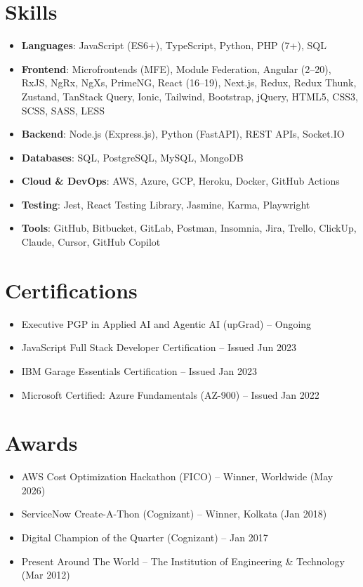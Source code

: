 \documentclass[letterpaper,11pt]{article}
\newcommand{\resumeItemPlain}[1]{
  \item\small{#1 \vspace{-2.5pt}}
}
\newcommand{\resumeSimpleListStart}{\begin{itemize}[leftmargin=0.15in, label=$\circ$, itemsep=1pt, parsep=0pt, topsep=1pt]}
\newcommand{\resumeSimpleListEnd}{\end{itemize}}
\newcommand{\resumeSkillLine}[2]{\item[]\small{\textbf{#1}: #2}\vspace{0.5pt}}
\begin{document}
\section{Skills}
  \begin{itemize}[leftmargin=0.15in, label={}, itemsep=1pt, parsep=0pt, topsep=1pt]
    \resumeSkillLine{\textbf{Languages}}{JavaScript (ES6+), TypeScript, Python, PHP (7+), SQL}
    \resumeSkillLine{\textbf{Frontend}}{Microfrontends (MFE), Module Federation, Angular (2--20), RxJS, NgRx, NgXs, PrimeNG, React (16--19), Next.js, Redux, Redux Thunk, Zustand, TanStack Query, Ionic, Tailwind, Bootstrap, jQuery, HTML5, CSS3, SCSS, SASS, LESS}
    \resumeSkillLine{\textbf{Backend}}{Node.js (Express.js), Python (FastAPI), REST APIs, Socket.IO}
    \resumeSkillLine{\textbf{Databases}}{SQL, PostgreSQL, MySQL, MongoDB}
    \resumeSkillLine{\textbf{Cloud \& DevOps}}{AWS, Azure, GCP, Heroku, Docker, GitHub Actions}
    \resumeSkillLine{\textbf{Testing}}{Jest, React Testing Library, Jasmine, Karma, Playwright}
    \resumeSkillLine{\textbf{Tools}}{GitHub, Bitbucket, GitLab, Postman, Insomnia, Jira, Trello, ClickUp, Claude, Cursor, GitHub Copilot}
  \end{itemize}


\section{Certifications}
 \resumeSimpleListStart
   \resumeItemPlain{Executive PGP in Applied AI and Agentic AI (upGrad) -- Ongoing}
   \resumeItemPlain{JavaScript Full Stack Developer Certification -- Issued Jun 2023}
   \resumeItemPlain{IBM Garage Essentials Certification -- Issued Jan 2023}
   \resumeItemPlain{Microsoft Certified: Azure Fundamentals (AZ-900) -- Issued Jan 2022}
 \resumeSimpleListEnd


\section{Awards}
 \resumeSimpleListStart
   \resumeItemPlain{AWS Cost Optimization Hackathon (FICO) -- Winner, Worldwide (May 2026)}
   \resumeItemPlain{ServiceNow Create-A-Thon (Cognizant) -- Winner, Kolkata (Jan 2018)}
   \resumeItemPlain{Digital Champion of the Quarter (Cognizant) -- Jan 2017}
   \resumeItemPlain{Present Around The World -- The Institution of Engineering \& Technology (Mar 2012)}
 \resumeSimpleListEnd
\end{document}
